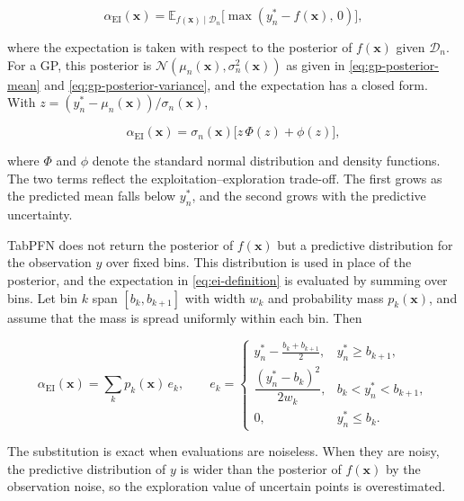 \begin{equation}
  \alpha_{\mathrm{EI}}(\boldsymbol{x}) = \mathbb{E}_{f(\boldsymbol{x}) \mid \mathcal{D}_n}\big[\max(y_n^* - f(\boldsymbol{x}),\, 0)\big],
  \label{eq:ei-definition}
\end{equation}

where the expectation is taken with respect to the posterior of $f(\boldsymbol{x})$ given $\mathcal{D}_n$. For a GP, this posterior is $\mathcal{N}(\mu_n(\boldsymbol{x}), \sigma_n^2(\boldsymbol{x}))$ as given in \eqref{eq:gp-posterior-mean} and \eqref{eq:gp-posterior-variance}, and the expectation has a closed form. With $z = (y_n^* - \mu_n(\boldsymbol{x})) / \sigma_n(\boldsymbol{x})$,

\begin{equation}
  \alpha_{\mathrm{EI}}(\boldsymbol{x}) = \sigma_n(\boldsymbol{x})\big[z\,\Phi(z) + \phi(z)\big],
  \label{eq:ei-closed-form}
\end{equation}

where $\Phi$ and $\phi$ denote the standard normal distribution and density functions. The two terms reflect the exploitation–exploration trade-off. The first grows as the predicted mean falls below $y_n^*$, and the second grows with the predictive uncertainty.

TabPFN does not return the posterior of $f(\boldsymbol{x})$ but a predictive distribution for the observation $y$ over fixed bins. This distribution is used in place of the posterior, and the expectation in \eqref{eq:ei-definition} is evaluated by summing over bins. Let bin $k$ span $[b_k, b_{k+1}]$ with width $w_k$ and probability mass $p_k(\boldsymbol{x})$, and assume that the mass is spread uniformly within each bin. Then

\begin{equation}
  \alpha_{\mathrm{EI}}(\boldsymbol{x}) = \sum_k p_k(\boldsymbol{x})\, e_k, \qquad
  e_k =
  \begin{cases}
  y_n^* - \tfrac{b_k + b_{k+1}}{2}, & y_n^* \ge b_{k+1},\\[2pt]
  \dfrac{(y_n^* - b_k)^2}{2 w_k}, & b_k < y_n^* < b_{k+1},\\[4pt]
  0, & y_n^* \le b_k.
  \end{cases}
\end{equation}

The substitution is exact when evaluations are noiseless. When they are noisy, the predictive distribution of $y$ is wider than the posterior of $f(\boldsymbol{x})$ by the observation noise, so the exploration value of uncertain points is overestimated. %

